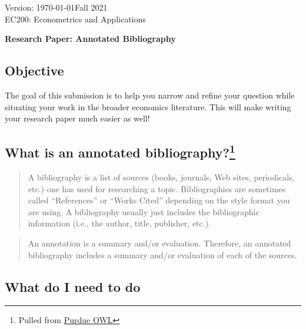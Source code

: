 \documentclass[11pt]{article}
\begin{document}
\thispagestyle{plain}
\singlespacing


Version: \today \hfill Fall 2021\\
EC200: Econometrics and Applications
\begin{center}
\Large{\textbf{Research Paper: Annotated Bibliography}}\\
\end{center}
\bigskip



\hypertarget{objective}{%
\subsection*{Objective}\label{objective}}

The goal of this submission is to help you narrow and refine your
question while situating your work in the broader economics literature.
This will make writing your research paper much easier as well!

\hypertarget{whatis}{%
\subsection*{\texorpdfstring{What is an annotated
bibliography?\footnote{Pulled from
  \href{https://owl.purdue.edu/owl/general_writing/common_writing_assignments/annotated_bibliographies/index.html}{Purdue
  OWL}}}{What is an annotated bibliography?}}\label{whatis}}

\begin{quote}
A bibliography is a list of sources (books, journals, Web sites,
periodicals, etc.) one has used for researching a topic. Bibliographies
are sometimes called ``References'' or ``Works Cited'' depending on the
style format you are using. A bibliography usually just includes the
bibliographic information (i.e., the author, title, publisher, etc.).
\end{quote}

\begin{quote}
An annotation is a summary and/or evaluation. Therefore, an annotated
bibliography includes a summary and/or evaluation of each of the
sources.
\end{quote}

\hypertarget{mission}{%
\subsection*{What do I need to do}\label{mission}}
\end{document}
